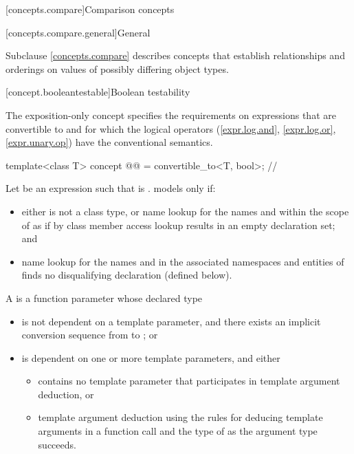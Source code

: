 [concepts.compare]{Comparison concepts}

[concepts.compare.general]{General}

\pnum
Subclause \ref{concepts.compare} describes concepts that establish relationships and orderings
on values of possibly differing object types.

[concept.booleantestable]{Boolean testability}

\pnum
The exposition-only  concept
specifies the requirements on expressions
that are convertible to  and
for which the logical operators
(\ref{expr.log.and}, \ref{expr.log.or}, \ref{expr.unary.op})
have the conventional semantics.

\begin{itemdecl}
template<class T>
  concept @@ = convertible_to<T, bool>;  // \expos
\end{itemdecl}

\pnum
Let  be an expression such that
 is .
 models  only if:

\begin{itemize}
\item
either  is not a class type, or
name lookup for the names  and 
within the scope of 
as if by class member access lookup
results in an empty declaration set; and

\item
name lookup for the names  and  in
the associated namespaces and
entities of 
finds no disqualifying declaration (defined below).
\end{itemize}

\pnum
A 
is a function parameter whose declared type 

\begin{itemize}
\item
is not dependent on a template parameter, and
there exists an implicit conversion sequence
from  to ; or

\item
is dependent on one or more template parameters, and either
\begin{itemize}
\item
{} contains no template parameter that
participates in template argument deduction, or
\item
template argument deduction
using the rules for deducing template arguments
in a function call and
the type of  as the argument type succeeds.
\end{itemize}
\end{itemize}

